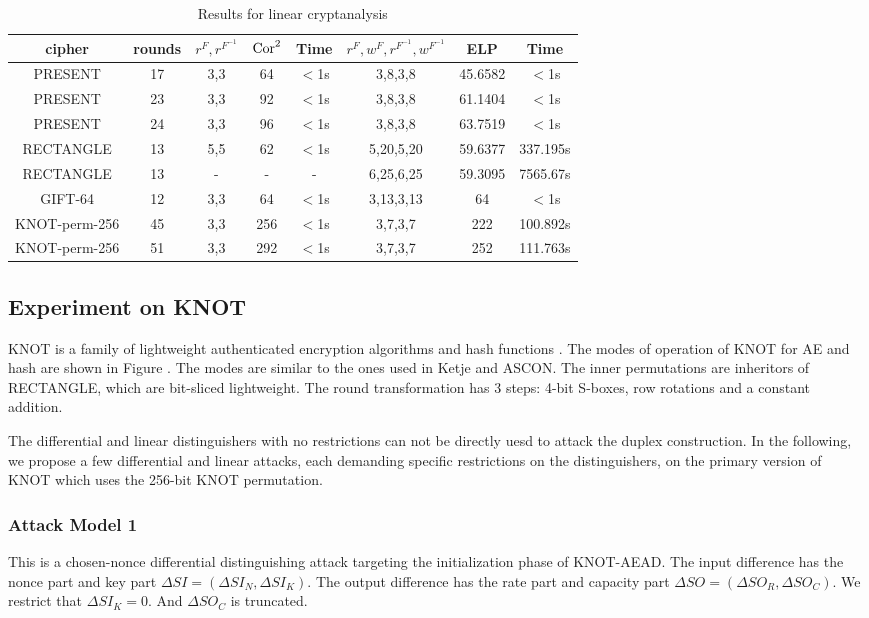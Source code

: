 \begin{table}
	\caption{Results for linear cryptanalysis}\label{tab:ELP}
	\centering
	\begin{tabular}{|c|c|c|c|c|c|c|c|}
		\hline
		cipher & rounds & $r^F,r^{F^{-1}}$ & $\text{Cor}^2$ & Time & $r^F,w^F,r^{F^{-1}},w^{F^{-1}}$ & ELP & Time \\
		\hline
		PRESENT & 17 & 3,3 & 64 & $<$1s & 3,8,3,8 & 45.6582 & $<$1s\\
		\hline 
		PRESENT & 23 & 3,3 & 92 & $<$1s & 3,8,3,8 & 61.1404 & $<$1s\\
		\hline 
		PRESENT & 24 & 3,3 & 96 & $<$1s & 3,8,3,8 & 63.7519 & $<$1s\\
		\hline 
		RECTANGLE & 13 & 5,5 & 62 & $<$1s & 5,20,5,20 & 59.6377 & 337.195s \\
		\hline
		RECTANGLE & 13 & - & - & - & 6,25,6,25 & 59.3095 & 7565.67s \\
		\hline
		GIFT-64 & 12 & 3,3 & 64 & $<$1s& 3,13,3,13 & 64 & $<$1s \\
		\hline
		KNOT-perm-256 & 45 & 3,3 & 256 & $<$1s & 3,7,3,7 & 222 & 100.892s\\
		\hline
		KNOT-perm-256 & 51 & 3,3 & 292 & $<$1s & 3,7,3,7 & 252 & 111.763s\\
		\hline
	\end{tabular}
\end{table}

\subsection{Experiment on KNOT}

KNOT is a family of lightweight authenticated encryption algorithms and hash functions \cite{ZDY19}. The modes of operation of KNOT for AE and hash are shown in Figure . The modes are similar to the ones used in Ketje and ASCON. The inner permutations are inheritors of RECTANGLE, which are bit-sliced lightweight. The round transformation has 3 steps: 4-bit S-boxes, row rotations and a constant addition. 

The differential and linear distinguishers with no restrictions can not be directly uesd to attack the duplex construction. In the following, we propose a few differential and linear attacks, each demanding specific restrictions on the distinguishers, on the primary version of KNOT which uses the 256-bit KNOT permutation.

\subsubsection{Attack Model 1}
This is a chosen-nonce differential distinguishing attack targeting the initialization phase of KNOT-AEAD. The input difference has the nonce part and key part $\Delta SI=(\Delta SI_N,\Delta SI_K)$. The output difference has the rate part and capacity part $\Delta SO=(\Delta SO_R,\Delta SO_C)$. We restrict that $\Delta SI_K=0$. And $\Delta SO_C$ is truncated.  

